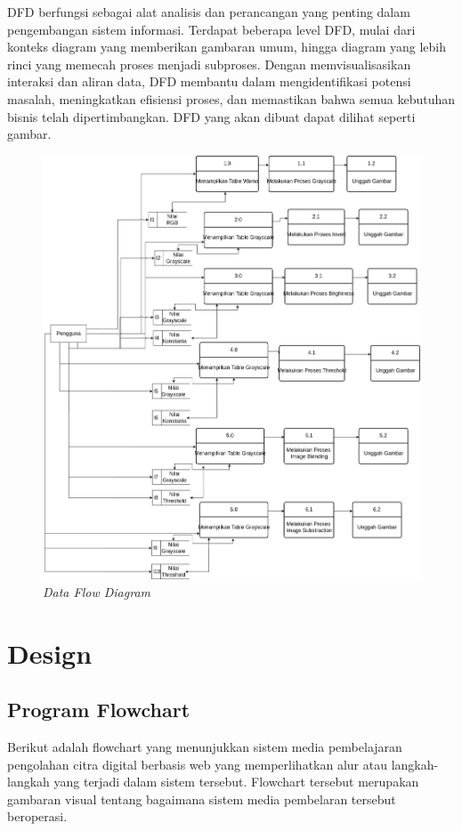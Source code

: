 DFD berfungsi sebagai alat analisis dan perancangan yang penting dalam pengembangan sistem informasi. Terdapat beberapa level DFD, mulai dari konteks diagram yang memberikan gambaran umum, hingga diagram yang lebih rinci yang memecah proses menjadi subproses. Dengan memvisualisasikan interaksi dan aliran data, DFD membantu dalam mengidentifikasi potensi masalah, meningkatkan efisiensi proses, dan memastikan bahwa semua kebutuhan bisnis telah dipertimbangkan. DFD yang akan dibuat dapat dilihat seperti gambar.

      \begin{figure}[ht]
          \includegraphics[width=14cm, center]{images/dfd.png}
          \caption{\textit{Data Flow Diagram}}
      \end{figure}

\section{Design}
\subsection{Program Flowchart}

Berikut adalah flowchart yang menunjukkan sistem media pembelajaran pengolahan citra digital berbasis web yang memperlihatkan alur atau langkah-langkah yang terjadi dalam sistem tersebut. Flowchart tersebut merupakan gambaran visual tentang bagaimana sistem media pembelaran tersebut beroperasi.

